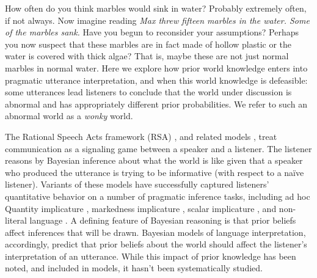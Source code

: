 \documentclass[10pt,letterpaper]{article}
\begin{document}
How often do you think marbles would sink in water? Probably extremely often, if not always. Now imagine reading \emph{Max threw fifteen marbles in the water. Some of the marbles sank.} Have you begun to reconsider your assumptions? Perhaps you now suspect that these marbles are in fact made of hollow plastic or the water is covered with thick algae? That is, maybe these are not just normal marbles in normal water. Here we explore how prior world knowledge enters into pragmatic utterance interpretation, and when this world knowledge is defeasible: some utterances lead listeners to conclude that the world under discussion is abnormal and has appropriately different prior probabilities. We refer to such an abnormal world  as a \emph{wonky} world.

The Rational Speech Acts framework (RSA)  \cite{frank2012,goodmanstuhlmueller2013}, and related models \cite{franke2011,russell2012}, treat communication as a signaling game \cite{lewis1969} between a speaker and a listener.
The listener reasons by Bayesian inference about what the world is like given that a speaker who produced the utterance is trying to be informative (with respect to a na\"ive listener). 
Variants of these models have successfully captured listeners' quantitative  behavior on a number of pragmatic inference tasks, including ad hoc Quantity implicature \cite{degenfrankejaeger2013}, markedness implicature \cite{bergengoodman2012}, scalar implicature \cite{goodmanstuhlmueller2013}, and non-literal language \cite{kao2014}. 
A defining feature of Bayesian reasoning is that prior beliefs affect inferences that will be drawn. Bayesian models of language interpretation, accordingly, predict that prior beliefs about the world should affect the listener's interpretation of an utterance. 
While this impact of prior knowledge has been noted, and included in models, it hasn't been systematically studied.
\end{document}
